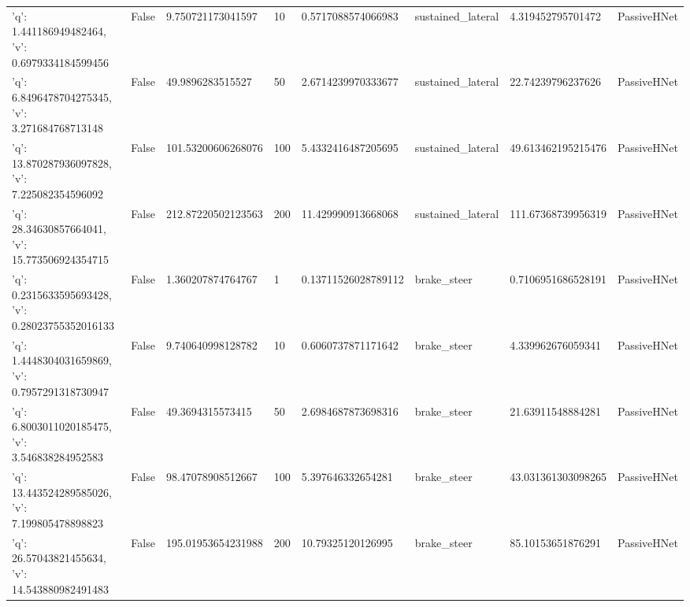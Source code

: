 \begin{tabular}{llllllll}
{'q': 1.441186949482464, 'v': 0.6979334184599456} & False & 9.750721173041597 & 10 & 0.5717088574066983 & sustained\_lateral & 4.319452795701472 & PassiveHNet \\
{'q': 6.8496478704275345, 'v': 3.271684768713148} & False & 49.9896283515527 & 50 & 2.6714239970333677 & sustained\_lateral & 22.74239796237626 & PassiveHNet \\
{'q': 13.870287936097828, 'v': 7.225082354596092} & False & 101.53200606268076 & 100 & 5.4332416487205695 & sustained\_lateral & 49.613462195215476 & PassiveHNet \\
{'q': 28.34630857664041, 'v': 15.773506924354715} & False & 212.87220502123563 & 200 & 11.429990913668068 & sustained\_lateral & 111.67368739956319 & PassiveHNet \\
{'q': 0.2315633595693428, 'v': 0.28023755352016133} & False & 1.360207874764767 & 1 & 0.13711526028789112 & brake\_steer & 0.7106951686528191 & PassiveHNet \\
{'q': 1.4448304031659869, 'v': 0.7957291318730947} & False & 9.740640998128782 & 10 & 0.6060737871171642 & brake\_steer & 4.339962676059341 & PassiveHNet \\
{'q': 6.8003011020185475, 'v': 3.546838284952583} & False & 49.3694315573415 & 50 & 2.6984687873698316 & brake\_steer & 21.63911548884281 & PassiveHNet \\
{'q': 13.443524289585026, 'v': 7.199805478898823} & False & 98.47078908512667 & 100 & 5.397646332654281 & brake\_steer & 43.031361303098265 & PassiveHNet \\
{'q': 26.57043821455634, 'v': 14.543880982491483} & False & 195.01953654231988 & 200 & 10.79325120126995 & brake\_steer & 85.10153651876291 & PassiveHNet \\
\bottomrule
\end{tabular}